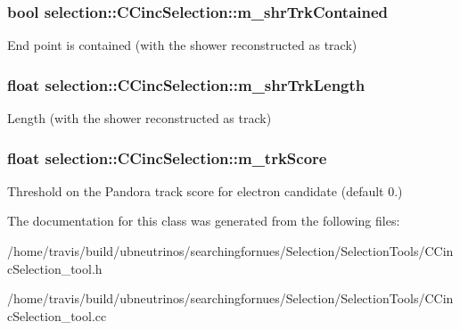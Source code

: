 \subsubsection[{\texorpdfstring{m\+\_\+shr\+Trk\+Contained}{m_shrTrkContained}}]{\setlength{\rightskip}{0pt plus 5cm}bool selection\+::\+C\+Cinc\+Selection\+::m\+\_\+shr\+Trk\+Contained\hspace{0.3cm}{\ttfamily [private]}}\hypertarget{classselection_1_1CCincSelection_a5cde5d5c0d798594d11f082dadaf52bc}{}\label{classselection_1_1CCincSelection_a5cde5d5c0d798594d11f082dadaf52bc}
End point is contained (with the shower reconstructed as track) 
\subsubsection[{\texorpdfstring{m\+\_\+shr\+Trk\+Length}{m_shrTrkLength}}]{\setlength{\rightskip}{0pt plus 5cm}float selection\+::\+C\+Cinc\+Selection\+::m\+\_\+shr\+Trk\+Length\hspace{0.3cm}{\ttfamily [private]}}\hypertarget{classselection_1_1CCincSelection_a09db29c4170084b4c366defeb3330de8}{}\label{classselection_1_1CCincSelection_a09db29c4170084b4c366defeb3330de8}
Length (with the shower reconstructed as track) 
\subsubsection[{\texorpdfstring{m\+\_\+trk\+Score}{m_trkScore}}]{\setlength{\rightskip}{0pt plus 5cm}float selection\+::\+C\+Cinc\+Selection\+::m\+\_\+trk\+Score\hspace{0.3cm}{\ttfamily [private]}}\hypertarget{classselection_1_1CCincSelection_a2c3b80516e3731ec9b4f5ccbee6864ba}{}\label{classselection_1_1CCincSelection_a2c3b80516e3731ec9b4f5ccbee6864ba}
Threshold on the Pandora track score for electron candidate (default 0.) 

The documentation for this class was generated from the following files\+:\begin{DoxyCompactItemize}
\item 
/home/travis/build/ubneutrinos/searchingfornues/\+Selection/\+Selection\+Tools/C\+Cinc\+Selection\+\_\+tool.\+h\item 
/home/travis/build/ubneutrinos/searchingfornues/\+Selection/\+Selection\+Tools/C\+Cinc\+Selection\+\_\+tool.\+cc\end{DoxyCompactItemize}
